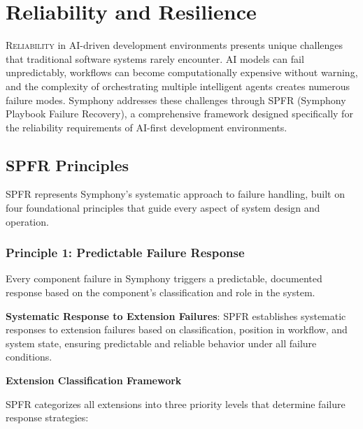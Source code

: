 
\section{Reliability and Resilience}
\label{sec:reliability-resilience}

\lettrine{R}{eliability} in AI-driven development environments presents unique challenges that traditional software systems rarely encounter. AI models can fail unpredictably, workflows can become computationally expensive without warning, and the complexity of orchestrating multiple intelligent agents creates numerous failure modes. Symphony addresses these challenges through SPFR (Symphony Playbook Failure Recovery), a comprehensive framework designed specifically for the reliability requirements of AI-first development environments.

\subsection{SPFR Principles}
\label{subsec:spfr-principles}

SPFR represents Symphony's systematic approach to failure handling, built on four foundational principles that guide every aspect of system design and operation.

\subsubsection{Principle 1: Predictable Failure Response}

Every component failure in Symphony triggers a predictable, documented response based on the component's classification and role in the system.

\begin{infobox}[title=SPFR Core Philosophy]
\textbf{Systematic Response to Extension Failures}: SPFR establishes systematic responses to extension failures based on classification, position in workflow, and system state, ensuring predictable and reliable behavior under all failure conditions.
\end{infobox}

\textbf{Extension Classification Framework}

SPFR categorizes all extensions into three priority levels that determine failure response strategies:


